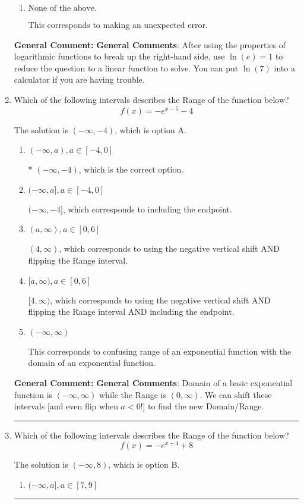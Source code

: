 \documentclass{extbook}[14pt]
\newcommand{\litem}[1]{\item #1

\rule{\textwidth}{0.4pt}}
\begin{document}
\begin{enumerate}
{\begin{enumerate}[label=\Alph*.]
This corresponds to believing you cannot solve the equation.
\item \( \text{None of the above.} \)

This corresponds to making an unexpected error.
\end{enumerate}

\textbf{General Comment:} \textbf{General Comments}: After using the properties of logarithmic functions to break up the right-hand side, use $\ln(e) = 1$ to reduce the question to a linear function to solve. You can put $\ln(7)$ into a calculator if you are having trouble.
}
\litem{
Which of the following intervals describes the Range of the function below?
\[ f(x) = -e^{x-5}-4 \]

The solution is \( (-\infty, -4) \), which is option A.\begin{enumerate}[label=\Alph*.]
\item \( (-\infty, a), a \in [-4, 0] \)

* $(-\infty, -4)$, which is the correct option.
\item \( (-\infty, a], a \in [-4, 0] \)

$(-\infty, -4]$, which corresponds to including the endpoint.
\item \( (a, \infty), a \in [0, 6] \)

$(4, \infty)$, which corresponds to using the negative vertical shift AND flipping the Range interval.
\item \( [a, \infty), a \in [0, 6] \)

$[4, \infty)$, which corresponds to using the negative vertical shift AND flipping the Range interval AND including the endpoint.
\item \( (-\infty, \infty) \)

This corresponds to confusing range of an exponential function with the domain of an exponential function.
\end{enumerate}

\textbf{General Comment:} \textbf{General Comments}: Domain of a basic exponential function is $(-\infty, \infty)$ while the Range is $(0, \infty)$. We can shift these intervals [and even flip when $a<0$!] to find the new Domain/Range.
}
\litem{
Which of the following intervals describes the Range of the function below?
\[ f(x) = -e^{x+4}+8 \]

The solution is \( (-\infty, 8) \), which is option B.\begin{enumerate}[label=\Alph*.]
\item \( (-\infty, a], a \in [7, 9] \)


\end{enumerate}}
\end{enumerate}
\end{document}
